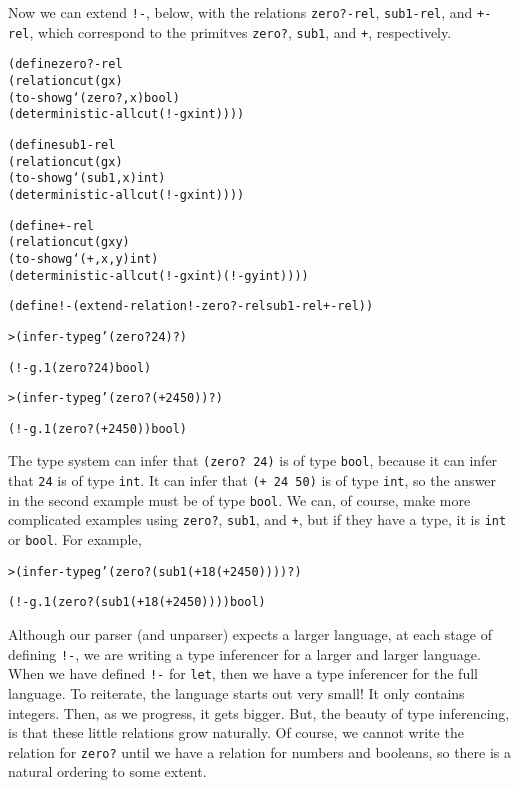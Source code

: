 Now we can extend \texttt{!-}, below, with the relations
\texttt{zero?-rel}, \texttt{sub1-rel}, and \texttt{+-rel}, which
correspond to the primitves \texttt{zero?}, \texttt{sub1}, and
\texttt{+}, respectively.

\begin{alltt}
(define zero?-rel
  (relation cut (g x)
    (to-show g `(zero? ,x) bool)
    (deterministic-all cut (!- g x int))))

(define sub1-rel
  (relation cut (g x)
    (to-show g `(sub1 ,x) int)
    (deterministic-all cut (!- g x int))))

(define +-rel
  (relation cut (g x y)
    (to-show g `(+ ,x ,y) int)
    (deterministic-all cut (!- g x int) (!- g y int))))
\end{alltt}

\begin{alltt}
(define !- (extend-relation !- zero?-rel sub1-rel +-rel))
\end{alltt}

\begin{alltt}
> (infer-type g '(zero? 24) ?)

(!- g.1 (zero? 24) bool)
\end{alltt}

\begin{alltt}
> (infer-type g '(zero? (+ 24 50)) ?)

(!- g.1 (zero? (+ 24 50)) bool)
\end{alltt}

The type system can infer that \texttt{(zero? 24)} is of type
\texttt{bool}, because it can infer that \texttt{24} is of type
\texttt{int}.  It can infer that \texttt{(+ 24 50)} is of type
\texttt{int}, so the answer in the second example must be of type
\texttt{bool}.  We can, of course, make more complicated examples
using \texttt{zero?}, \texttt{sub1}, and \texttt{+}, but if they have
a type, it is \texttt{int} or \texttt{bool}.  For example,

\begin{alltt}
> (infer-type g '(zero? (sub1 (+ 18 (+ 24 50)))) ?)

(!- g.1 (zero? (sub1 (+ 18 (+ 24 50)))) bool)
\end{alltt}

Although our parser (and unparser) expects a larger language, at each
stage of defining \texttt{!-}, we are writing a type inferencer for a
larger and larger language.  When we have defined \texttt{!-} for
\texttt{let}, then we have a type inferencer for the full language.
To reiterate, the language starts out very small! It only contains
integers.  Then, as we progress, it gets bigger.  But, the beauty of
type inferencing, is that these little relations grow naturally.  Of
course, we cannot write the relation for \texttt{zero?}  until we have
a relation for numbers and booleans, so there is a natural ordering to
some extent.

